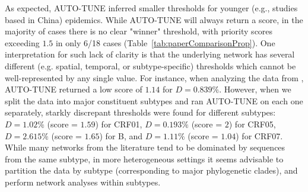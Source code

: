 \documentclass[utf8]{FrontiersinHarvard} %
\begin{document}
As expected, AUTO-TUNE inferred smaller thresholds for younger (e.g., studies
based in China) epidemics. While AUTO-TUNE will always return a score, in the
majority of cases there is no clear "winner" threshold, with priority scores
exceeding $1.5$ in only 6/18 cases (Table~\ref{tab:paperComparisonProp}). One
interpretation for such lack of clarity is that the underlying network has
several different (e.g. spatial, temporal, or subtype-specific) thresholds
which cannot be well-represented by any single value.  For instance, when
analyzing the data from \citet{Yan:2021aa}, AUTO-TUNE returned a low score of
$1.14$ for $D=0.839\%$. However, when we split the  data into major constituent
subtypes and ran AUTO-TUNE on each one separately, starkly discrepant
thresholds were found for different subtypes: $D=1.02\%$ (score = $1.59$) for
CRF01,   $D=0.193\%$ (score = $2$) for CRF05,  $D=2.615\%$ (score = $1.65$)
for B,  and $D=1.11\%$ (score = $1.04$) for CRF07. While many networks from the
literature tend to be dominated by sequences from the same subtype, in more
heterogeneous settings it seems advisable to partition the data by subtype
(corresponding to major phylogenetic clades), and perform network analyses
within subtypes. 
\end{document}
